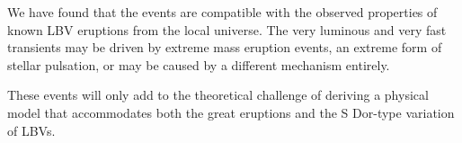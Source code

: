 We have found that the \spock events are compatible with the observed
properties of known LBV eruptions from the local universe.
The very luminous and very fast \spock
transients may be driven by extreme mass eruption events, an extreme
form of stellar pulsation, or may be caused by a different mechanism
entirely.

These events will only add to the theoretical challenge of deriving a
physical model that accommodates both the great eruptions and the S
Dor-type variation of LBVs.


